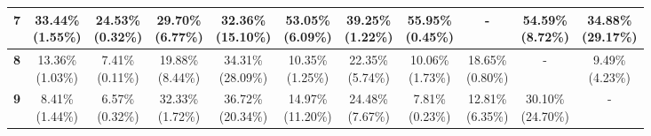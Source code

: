 \documentclass{report}
\begin{document}
\begin{center}
{\begin{tabular}{|c|c|c|c|c|c|c|c|c|c|c|}
  \textbf{7} & \makecell{33.44\% \\ (1.55\%)} & \makecell{24.53\% \\ (0.32\%)} & \makecell{29.70\% \\ (6.77\%)} & \makecell{32.36\% \\ (15.10\%)} & \makecell{53.05\% \\ (6.09\%)} & \makecell{39.25\% \\ (1.22\%)} & \makecell{55.95\% \\ (0.45\%)} & - & \makecell{54.59\% \\ (8.72\%)} & \makecell{34.88\% \\ (29.17\%)} \\ \hline
  \textbf{8} & \makecell{13.36\% \\ (1.03\%)} & \makecell{7.41\% \\ (0.11\%)} & \makecell{19.88\% \\ (8.44\%)} & \makecell{34.31\% \\ (28.09\%)} & \makecell{10.35\% \\ (1.25\%)} & \makecell{22.35\% \\ (5.74\%)} & \makecell{10.06\% \\ (1.73\%)} & \makecell{18.65\% \\ (0.80\%)} & - & \makecell{9.49\% \\ (4.23\%)} \\ \hline
  \textbf{9} & \makecell{8.41\% \\ (1.44\%)} & \makecell{6.57\% \\ (0.32\%)} & \makecell{32.33\% \\ (1.72\%)} & \makecell{36.72\% \\ (20.34\%)} & \makecell{14.97\% \\ (11.20\%)} & \makecell{24.48\% \\ (7.67\%)} & \makecell{7.81\% \\ (0.23\%)} & \makecell{12.81\% \\ (6.35\%)} & \makecell{30.10\% \\ (24.70\%)} & - \\ \hline
  \end{tabular}
}
\end{center}
\end{document}
